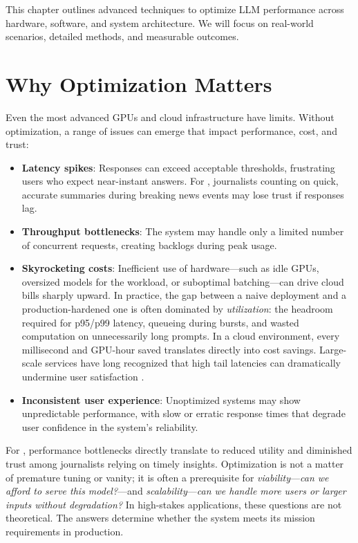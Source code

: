 This chapter outlines advanced techniques to optimize LLM performance across hardware, software, and system architecture. We will focus on real-world scenarios, detailed methods, and measurable outcomes.

\section{Why Optimization Matters}
\label{sec:perf-why}
Even the most advanced GPUs and cloud infrastructure have limits. Without optimization, a range of issues can emerge that impact performance, cost, and trust:

\begin{itemize}
    \item \textbf{Latency spikes}: Responses can exceed acceptable thresholds, frustrating users who expect near-instant answers. For \ishtar{}, journalists counting on quick, accurate summaries during breaking news events may lose trust if responses lag.
    \item \textbf{Throughput bottlenecks}: The system may handle only a limited number of concurrent requests, creating backlogs during peak usage.
    \item \textbf{Skyrocketing costs}: Inefficient use of hardware---such as idle GPUs, oversized models for the workload, or suboptimal batching---can drive cloud bills sharply upward. In practice, the gap between a naive deployment and a production-hardened one is often dominated by \emph{utilization}: the headroom required for p95/p99 latency, queueing during bursts, and wasted computation on unnecessarily long prompts. In a cloud environment, every millisecond and GPU-hour saved translates directly into cost savings. Large-scale services have long recognized that high tail latencies can dramatically undermine user satisfaction \cite{Dean2013Tail}.
\item \textbf{Inconsistent user experience}: Unoptimized systems may show unpredictable performance, with slow or erratic response times that degrade user confidence in the system’s reliability.
\end{itemize}

For \ishtar{}, performance bottlenecks directly translate to reduced utility and diminished trust among journalists relying on timely insights. Optimization is not a matter of premature tuning or vanity; it is often a prerequisite for \emph{viability}---\textit{can we afford to serve this model?}---and \emph{scalability}---\textit{can we handle more users or larger inputs without degradation?} In high-stakes applications, these questions are not theoretical. The answers determine whether the system meets its mission requirements in production.


